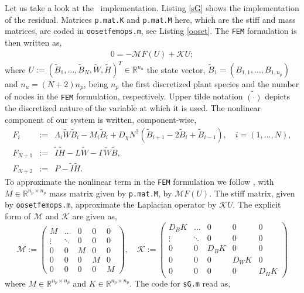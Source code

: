 \documentclass[a4paper,12pt]{article}
\begin{document}
Let us take a look at the \pdep \, implementation. Listing \ref{sG} shows the implementation of the residual. Matrices {\tt p.mat.K} and {\tt p.mat.M} here, which are the stiff and mass matrices, are coded in {\tt oosetfemops.m}, see Listing \ref{ooset}. The {\tt FEM} formulation is then written as,
\begin{eqnarray}
0=-\mathcal{M} F(U) + \mathcal{K}U;
\end{eqnarray}    
where $U:=\left( \tilde{B}_1,\dots,\tilde{B}_N,\tilde{W},\tilde{H} \right)^T\in\mathbb{R}^{n_u}$ the state vector, $\tilde{B}_1=\left(B_{1,1},\dots,B_{1,n_p}\right)$ and $n_u= (N+2) n_p$, being $n_p$ the first discretized plant species and the number of nodes in the {\tt FEM} formulation, respectively. Upper tilde notation $\tilde{(\cdot)}$ depicts the discretized nature of the variable at which it is used. The nonlinear component of our system is written, component-wise, 
\begin{eqnarray*}
    F_i&:=& \Lambda_i \tilde{W} \tilde{B}_i - M_i \tilde{B}_i + D_\chi N^2\left( \tilde{B}_{i+1}-2\tilde{B}_i+\tilde{B}_{i-1} \right),\quad i=(1,\dots,N),\\
    F_{N+1} &:=& \tilde{I}\tilde{H} - L \tilde{W} - \Gamma \tilde{W}\tilde{B},\\
    F_{N+2} &:=& P - \tilde{I}\tilde{H}.
\end{eqnarray*}
To approximate the nonlinear term in the {\tt FEM} formulation we follow \cite{uecker2021numerical}, with $M\in\mathbb{R}^{n_p\times n_p}$ mass matrix given by {\tt p.mat.M}, by $\mathcal{M} F(U)$. The stiff matrix, given by {\tt oosetfemops.m}, approximate the Laplacian operator by $\mathcal{K}U$. The explicit form of $\mathcal{M}$ and $\mathcal{K}$ are given as, 
\begin{equation*}
    \mathcal{M}:= \begin{pmatrix}
        M &\dots & 0 &0 & 0\\
        \vdots& \ddots & 0 & 0& 0 \\
        0&0&M&0&0\\
        0&0&0&M&0\\
        0&0&0&0&M
    \end{pmatrix},\quad \mathcal{K}:= \begin{pmatrix}
        D_B K &\dots & 0 &0 & 0\\
        \vdots& \ddots & 0 & 0& 0 \\
        0&0&D_B K&0&0\\
        0&0&0&D_W K&0\\
        0&0&0&0&D_H K
    \end{pmatrix}
\end{equation*}
where $M\in\mathbb{R}^{n_p\times n_p}$ and $K\in\mathbb{R}^{n_p\times n_p}$. The code for {\tt sG.m} read as,

\end{document}
